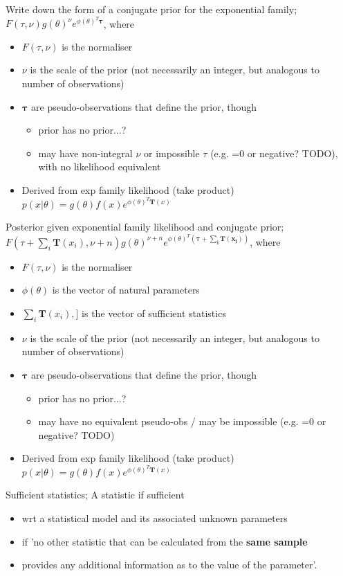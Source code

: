 \documentclass{article}
\begin{document}
Write down the form of a conjugate prior for the exponential family; $F(\tau, \nu)g(\theta)^\nu e^{\phi (\theta)^T\mathbf{\tau}}$, where \begin{itemize}
	\item $F(\tau, \nu)$ is the normaliser
	\item $\nu$ is the scale of the prior (not necessarily an integer, but analogous to number of observations)
	\item $\mathbf{\tau}$ are pseudo-observations that define the prior, though
	\begin{itemize}
		\item prior has no prior...?
		\item may have non-integral $\nu$ or impossible $\tau$ (e.g. =0 or negative? TODO), with no likelihood equivalent
	\end{itemize}
\item Derived from exp family likelihood (take product) $p(x|\theta) = g(\theta)f(x)e^{\phi(\theta)^T\mathbf{T}(x)}$
\end{itemize}

Posterior given exponential family likelihood and conjugate prior; $F(\tau + \sum_i\mathbf{T}(x_i), \nu + n)g(\theta)^{\nu+n} e^{\phi (\theta)^T\mathbf{(\tau+\sum_i\mathbf{T}(x_i))}}$, where \begin{itemize}
	\item $F(\tau, \nu)$ is the normaliser
	\item $\phi(\theta)$ is the vector of natural parameters
	\item $\sum_i\mathbf{T}(x_i),]$ is the vector of sufficient statistics
	\item $\nu$ is the scale of the prior (not necessarily an integer, but analogous to number of observations)
	\item $\mathbf{\tau}$ are pseudo-observations that define the prior, though
	\begin{itemize}
		\item prior has no prior...?
		\item may have no equivalent pseudo-obs / may be impossible (e.g. =0 or negative? TODO)
	\end{itemize}
	\item Derived from exp family likelihood (take product) $p(x|\theta) = g(\theta)f(x)e^{\phi(\theta)^T\mathbf{T}(x)}$
\end{itemize}

Sufficient statistics; A statistic if sufficient \begin{itemize}
	\item wrt a statistical model and its associated unknown parameters 
	\item if 'no other statistic that can be calculated from the \textbf{same sample} 
	\item provides any additional information as to the value of the parameter'.
\end{itemize}
\end{document}
